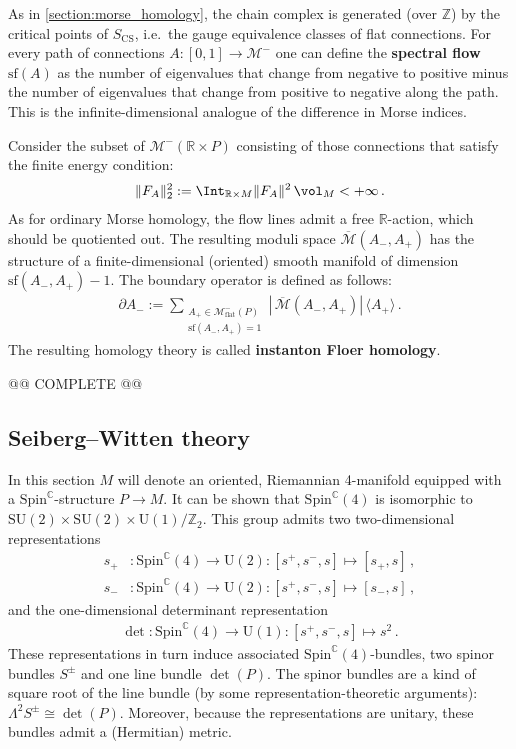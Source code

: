     As in \cref{section:morse_homology}, the chain complex is generated (over $\mathbb{Z}$) by the critical points of $S_{\text{CS}}$, i.e.~the gauge equivalence classes of flat connections. For every path of connections $A:[0,1]\rightarrow\mathcal{M}^-$ one can define the \textbf{spectral flow} $\mathrm{sf}(A)$ as the number of eigenvalues that change from negative to positive minus the number of eigenvalues that change from positive to negative along the path. This is the infinite-dimensional analogue of the difference in Morse indices.

    Consider the subset of $\mathcal{M}^-(\mathbb{R}\times P)$ consisting of those connections that satisfy the finite energy condition:
    \begin{gather}
        \|F_A\|^2_2 := \Int_{\mathbb{R}\times M}\|F_A\|^2\,\vol_M<+\infty\,.
    \end{gather}
    As for ordinary Morse homology, the flow lines admit a free $\mathbb{R}$-action, which should be quotiented out. The resulting moduli space $\overline{\mathcal{M}}(A_-,A_+)$ has the structure of a finite-dimensional (oriented) smooth manifold of dimension $\mathrm{sf}(A_-,A_+)-1$. The boundary operator is defined as follows:
    \begin{gather}
        \partial A_- := \sum_{\substack{A_+\in\mathcal{M}^-_{\text{flat}}(P)\\\mathrm{sf}(A_-,A_+)=1}}\left|\,\overline{\mathcal{M}}(A_-,A_+)\right|\,\langle A_+ \rangle\,.
    \end{gather}
    The resulting homology theory is called \textbf{instanton Floer homology}.

    @@ COMPLETE @@

\subsection{Seiberg--Witten theory}

    In this section $M$ will denote an oriented, Riemannian 4-manifold equipped with a $\mathrm{Spin}^{\mathbb{C}}$-structure $P\rightarrow M$. It can be shown that $\mathrm{Spin}^{\mathbb{C}}(4)$ is isomorphic to $\mathrm{SU}(2)\times\mathrm{SU}(2)\times\mathrm{U}(1)/\mathbb{Z}_2$. This group admits two two-dimensional representations
    \begin{align}
        s_+&:\mathrm{Spin}^{\mathbb{C}}(4)\rightarrow\mathrm{U}(2):[s^+,s^-,s]\mapsto[s_+,s]\,,\\
        s_-&:\mathrm{Spin}^{\mathbb{C}}(4)\rightarrow\mathrm{U}(2):[s^+,s^-,s]\mapsto[s_-,s]\,,
    \end{align}
    and the one-dimensional determinant representation
    \begin{gather}
        \det:\mathrm{Spin}^{\mathbb{C}}(4)\rightarrow\mathrm{U}(1):[s^+,s^-,s]\mapsto s^2\,.
    \end{gather}
    These representations in turn induce associated $\mathrm{Spin}^{\mathbb{C}}(4)$-bundles, two spinor bundles $S^\pm$ and one line bundle $\det(P)$. The spinor bundles are a kind of square root of the line bundle (by some representation-theoretic arguments): $\Lambda^2S^\pm\cong\det(P)$. Moreover, because the representations are unitary, these bundles admit a (Hermitian) metric.


